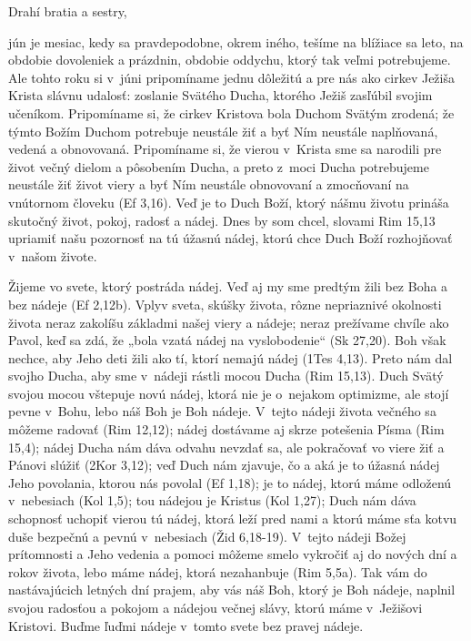 


Drahí bratia a sestry,

jún je mesiac, kedy sa pravdepodobne, okrem iného, tešíme na blížiace sa leto, na obdobie dovoleniek a prázdnin, obdobie oddychu, ktorý tak veľmi potrebujeme. Ale tohto roku si v~júni pripomíname jednu dôležitú a pre nás ako cirkev Ježiša Krista slávnu udalosť: zoslanie Svätého Ducha, ktorého Ježiš zasľúbil svojim učeníkom. Pripomíname si, že cirkev Kristova bola Duchom Svätým zrodená; že týmto Božím Duchom potrebuje neustále žiť a byť Ním neustále naplňovaná, vedená a obnovovaná. Pripomíname si, že vierou v~Krista sme sa narodili pre život večný dielom a pôsobením Ducha, a preto z~moci Ducha potrebujeme neustále žiť život viery a byť Ním neustále obnovovaní a zmocňovaní na vnútornom človeku (Ef 3,16). Veď je to Duch Boží, ktorý nášmu životu prináša skutočný život, pokoj, radosť a nádej. Dnes by som chcel, slovami Rim 15,13 upriamiť našu pozornosť na tú úžasnú nádej, ktorú chce Duch Boží rozhojňovať v~našom živote.

Žijeme vo svete, ktorý postráda nádej. Veď aj my sme predtým žili bez Boha a bez nádeje (Ef 2,12b). Vplyv sveta, skúšky života, rôzne nepriaznivé okolnosti života neraz zakolíšu základmi našej viery a nádeje; neraz prežívame chvíle ako Pavol, keď sa zdá, že „bola vzatá nádej na vyslobodenie“ (Sk 27,20). Boh však nechce, aby Jeho deti žili ako tí, ktorí nemajú nádej (1Tes 4,13). Preto nám dal svojho Ducha, aby sme v~nádeji rástli mocou Ducha (Rim 15,13). Duch Svätý svojou mocou vštepuje novú nádej, ktorá nie je o~nejakom optimizme, ale stojí pevne v~Bohu, lebo náš Boh je Boh nádeje. V~tejto nádeji života večného sa môžeme radovať (Rim 12,12); nádej dostávame aj skrze potešenia Písma (Rim 15,4); nádej Ducha nám dáva odvahu nevzdať sa, ale pokračovať vo viere žiť a Pánovi slúžiť (2Kor 3,12); veď Duch nám zjavuje, čo a aká je to úžasná nádej Jeho povolania, ktorou nás povolal (Ef 1,18); je to nádej, ktorú máme odloženú v~nebesiach (Kol 1,5); tou nádejou je Kristus (Kol 1,27); Duch nám dáva schopnosť uchopiť vierou tú nádej, ktorá leží pred nami a ktorú máme sťa kotvu duše  bezpečnú a pevnú v~nebesiach (Žid 6,18-19). V~tejto nádeji Božej prítomnosti a Jeho vedenia a pomoci môžeme smelo vykročiť aj do nových dní a rokov života, lebo máme nádej, ktorá nezahanbuje (Rim 5,5a). Tak vám do nastávajúcich letných dní prajem, aby vás náš Boh, ktorý je Boh nádeje, naplnil svojou radosťou a pokojom a nádejou večnej slávy, ktorú máme v~Ježišovi Kristovi. Buďme ľuďmi nádeje v~tomto svete bez pravej nádeje.

